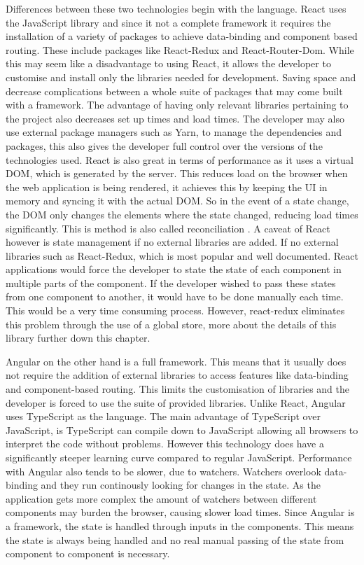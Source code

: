 Differences between these two technologies begin with the language. React uses the JavaScript library and since it not a complete framework it requires the installation of a variety of packages to achieve data-binding and component based routing. These include packages like React-Redux and React-Router-Dom. While this may seem like a disadvantage to using React, it allows the developer to customise and install only the libraries needed for development. Saving space and decrease complications between a whole suite of packages that may come built with a framework. The advantage of having only relevant libraries pertaining to the project also decreases set up times and load times. The developer may also use external package managers such as Yarn, to manage the dependencies and packages, this also gives the developer full control over the versions of the technologies used. React is also great in terms of performance as it uses a virtual DOM, which is generated by the server. This reduces load on the browser when the web application is being rendered, it achieves this by keeping the UI in memory and syncing it with the actual DOM. So in the event of a state change, the DOM only changes the elements where the state changed, reducing load times significantly. This is method is also called reconciliation \cite{reactDom}. A caveat of React however is state management if no external libraries are added. If no external libraries such as React-Redux, which is most popular and well documented. React applications would force the developer to state the state of each component in multiple parts of the component. If the developer wished to pass these states from one component to another, it would have to be done manually each time. This would be a very time consuming process. However, react-redux eliminates this problem through the use of a global store, more about the details of this library further down this chapter.

Angular on the other hand is a full framework. This means that it usually does not require the addition of external libraries to access features like data-binding and component-based routing. This limits the customisation of libraries and the developer is forced to use the suite of provided libraries. Unlike React, Angular uses TypeScript as the language. The main advantage of TypeScript over JavaScript, is TypeScript can compile down to JavaScript allowing all browsers to interpret the code without problems. However this technology does have a significantly steeper learning curve compared to regular JavaScript. Performance with Angular also tends to be slower, due to watchers. Watchers overlook data-binding and they run continously looking for changes in the state. As the application gets more complex the amount of watchers between different components may burden the browser, causing slower load times. Since Angular is a framework, the state is handled through inputs in the components. This means the state is always being handled and no real manual passing of the state from component to component is necessary.

